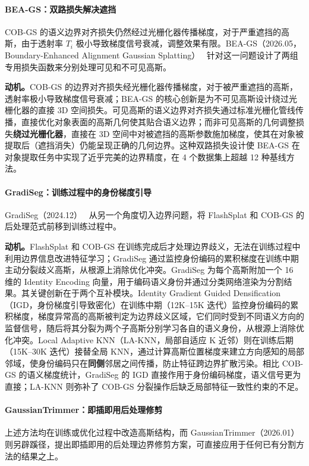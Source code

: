 \paragraph{BEA-GS：双路损失解决遮挡} COB-GS 的语义边界对齐损失仍然经过光栅化器传播梯度，对于严重遮挡的高斯，由于透射率 $T_i$ 极小导致梯度信号衰减，调整效果有限。BEA-GS（2026.05，Boundary-Enhanced Alignment Gaussian Splatting）~\cite{2605_09662} 针对这一问题设计了两组专用损失函数来分别处理可见和不可见高斯。

\textbf{动机。}COB-GS 的边界对齐损失经光栅化器传播梯度，对于被严重遮挡的高斯，透射率极小导致梯度信号衰减；BEA-GS 的核心创新是为不可见高斯设计绕过光栅化器的直接 3D 空间损失。可见高斯的语义边界对齐损失通过标准光栅化管线传播，直接优化对象表面的高斯几何使其贴合语义边界；而非可见高斯的几何调整损失\textbf{绕过光栅化器}，直接在 3D 空间中对被遮挡的高斯参数施加梯度，使其在对象被提取后（遮挡消失）仍能呈现正确的几何边界。这种双路损失设计使 BEA-GS 在对象提取任务中实现了近乎完美的边界精度，在 4 个数据集上超越 12 种基线方法。

\paragraph{GradiSeg：训练过程中的身份梯度引导} GradiSeg（2024.12）~\cite{2412_00392} 从另一个角度切入边界问题，将 FlashSplat 和 COB-GS 的后处理范式前移到训练过程中。

\textbf{动机。}FlashSplat 和 COB-GS 在训练完成后才处理边界歧义，无法在训练过程中利用边界信息改进特征学习；GradiSeg 通过监控身份编码的累积梯度在训练中期主动分裂歧义高斯，从根源上消除优化冲突。GradiSeg 为每个高斯附加一个 16 维的 Identity Encoding 向量，用于编码语义身份并通过分类网络渲染为分割结果。其关键创新在于两个互补模块。Identity Gradient Guided Densification（IGD，身份梯度引导致密化）在训练中期（12K--15K 迭代）监控身份编码的累积梯度，梯度异常高的高斯被判定为边界歧义区域，它们同时受到不同语义方向的监督信号，随后将其分裂为两个子高斯分别学习各自的语义身份，从根源上消除优化冲突。Local Adaptive KNN（LA-KNN，局部自适应 K 近邻）则在训练后期（15K--30K 迭代）接替全局 KNN，通过计算高斯位置梯度来建立方向感知的局部邻域，使身份编码只在\textbf{同侧}邻居之间传播，防止特征跨边界扩散污染。相比 COB-GS 的语义梯度统计，GradiSeg 的 IGD 直接作用于身份编码梯度，语义信号更为直接；LA-KNN 则弥补了 COB-GS 分裂操作后缺乏局部特征一致性约束的不足。

\paragraph{GaussianTrimmer：即插即用后处理修剪} 上述方法均在训练或优化过程中改造高斯结构，而 GaussianTrimmer（2026.01）~\cite{2601_12683} 则另辟蹊径，提出即插即用的后处理边界修剪方案，可直接应用于任何已有分割方法的结果之上。

